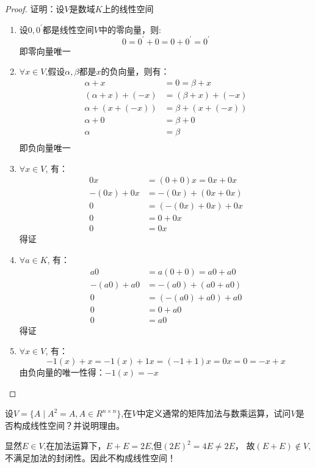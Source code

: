 \begin{proof}
    证明：设$V$是数域$K$上的线性空间
    \begin{enumerate}
        \item 设$0,0^{'}$都是线性空间$ V $中的零向量，则:
    \begin{equation*}
        0 = 0^{'} + 0 = 0 + 0^{'} = 0^{'}
    \end{equation*}
    即零向量唯一

        \item $\forall x \in V$,假设$\alpha, \beta$都是$x$的负向量，则有：
        \begin{align*}
                \alpha + x &= 0 = \beta + x\\
                (\alpha + x) + (-x) &= (\beta + x) + (-x)\\
                \alpha + (x + (-x)) &= \beta + (x + (-x))\\
                \alpha + 0 &= \beta + 0\\
                \alpha &= \beta\\
        \end{align*}
        即负向量唯一

        \item $\forall x \in V$, 有：
        \begin{align*}
            0x &= (0 + 0)x = 0x + 0x \\
            -(0x) + 0x &= -(0x) + (0x + 0x) \\
            0 &= (-(0x) + 0x) + 0x\\
            0 &= 0 + 0x\\
            0 &= 0x
        \end{align*}
        得证

        \item $\forall a \in K$, 有：
        \begin{align*}
            a0 &= a(0 + 0) = a0 + a0 \\
            -(a0) + a0 &= -(a0) + (a0 + a0) \\
            0 &= (-(a0) + a0) + a0\\
            0 &= 0 + a0\\
            0 &= a0
        \end{align*}
        得证

        \item $\forall x \in V$, 有：
        \begin{equation*}
            -1(x) + x = -1(x) + 1x = (-1 + 1)x = 0x = 0 = -x + x
        \end{equation*}
        由负向量的唯一性得：$-1(x) = -x$
    \end{enumerate}
\end{proof}

\begin{homework}
        设$V = \{A \mid A^2 = A, A \in R^{n \times n}\}$,在$V$中定义通常的矩阵加法与数乘运算，试问$V$是否构成线性空间？并说明理由。
\end{homework}
\begin{solution}
    显然$E \in V$,在加法运算下，$E + E = 2E$,但$(2E)^2=4E \neq 2E$，
    故$(E + E) \not\in V$,不满足加法的封闭性。因此不构成线性空间！
\end{solution}